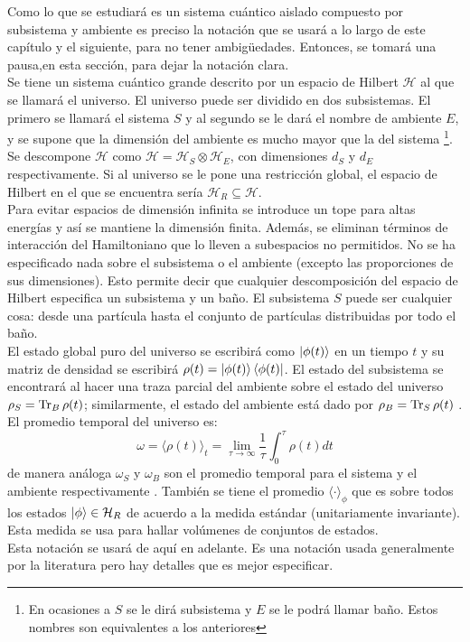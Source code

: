 Como lo que se estudiará es un sistema cuántico aislado compuesto por subsistema y ambiente es preciso la notación que se usará a lo largo de este capítulo y el siguiente, para no tener ambigüedades. Entonces, se tomará una pausa,en esta sección, para dejar la notación clara.
\\
Se tiene un sistema cuántico grande descrito por un espacio de Hilbert $\mathcal{H}$ al que se llamará el universo. El universo puede ser dividido en dos subsistemas. El primero se llamará el sistema $S$ y al segundo se le dará el nombre de ambiente $E$, y se supone que la dimensión del ambiente es mucho mayor que la del sistema \footnote{En ocasiones a $S$ se le dirá subsistema y $E$ se le podrá llamar baño. Estos nombres son equivalentes a los anteriores}. Se descompone $\mathcal{H}$ como $\mathcal{H}=\mathcal{H}_{S} \otimes \mathcal{H}_{E}$, con dimensiones $d_{S}$ y $d_{E}$ respectivamente. Si al universo se le pone una restricción global, el espacio de Hilbert en el que se encuentra sería $\mathcal{H}_{R} \subseteq \mathcal{H}$.
\\
Para evitar espacios de dimensión infinita se introduce un tope para altas energías y así se mantiene la dimensión finita. Además, se eliminan términos de interacción del Hamiltoniano que lo lleven a subespacios no permitidos.  No se ha especificado nada sobre el subsistema o el ambiente (excepto las proporciones de sus dimensiones). Esto permite decir que cualquier descomposición del espacio de Hilbert especifica un subsistema y un baño. El subsistema $S$ puede ser cualquier cosa: desde una partícula hasta el conjunto de partículas distribuidas por todo el baño.
\\
El estado global puro del universo se escribirá como $\ket{\phi(t)}$ en un tiempo $t$ y su matriz de densidad se escribirá $\rho(t)=\ket{\phi(t)}\bra{\phi(t)}$. El estado del subsistema se encontrará al hacer una traza parcial del ambiente sobre el estado del universo $\rho_{S}= \Tr _{B} \rho(t)$; similarmente, el estado del ambiente está dado por $\rho_{B}=\Tr _{S} \rho(t)$ \cite{WildeInformation}. 
\\
El promedio temporal del universo es:
\begin{equation}
\omega= \langle \rho(t) \rangle_{t}= \lim_{\tau \to \infty} \frac{1}{\tau} \int_{0}^{\tau} \rho (t)dt
\end{equation}
de manera análoga $\omega_{S}$ y $\omega_{B}$ son el promedio temporal para el sistema y el ambiente respectivamente \cite{TodaStat}. También se tiene el promedio $\langle \cdot \rangle_{\phi}$ que es sobre todos los estados $\ket{\phi} \in \mathcal{H}_{R}$ de acuerdo a la medida estándar (unitariamente invariante). Esta medida se usa para hallar volúmenes de conjuntos de estados.
\\
Esta notación se usará de aquí en adelante. Es una notación usada generalmente por la literatura pero hay detalles que es mejor especificar.
